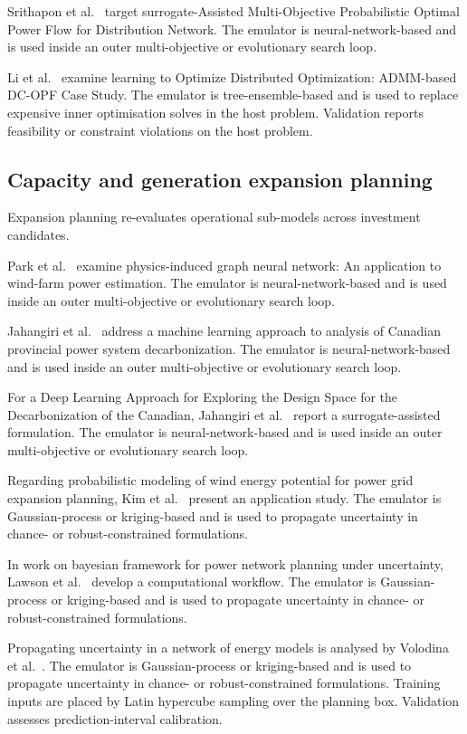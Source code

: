 Srithapon et al.~\cite{Srithapon202134395} target surrogate-Assisted Multi-Objective Probabilistic Optimal Power Flow for Distribution Network. The emulator is neural-network-based and is used inside an outer multi-objective or evolutionary search loop.

Li et al.~\cite{Li2023__2} examine learning to Optimize Distributed Optimization: ADMM-based DC-OPF Case Study. The emulator is tree-ensemble-based and is used to replace expensive inner optimisation solves in the host problem. Validation reports feasibility or constraint violations on the host problem.

\subsection{Capacity and generation expansion planning}
\label{sec:apps:expansion}

Expansion planning re-evaluates operational sub-models across investment candidates.

Park et al.~\cite{Park2019} examine physics-induced graph neural network: An application to wind-farm power estimation. The emulator is neural-network-based and is used inside an outer multi-objective or evolutionary search loop.

Jahangiri et al.~\cite{Jahangiri20244849} address a machine learning approach to analysis of Canadian provincial power system decarbonization. The emulator is neural-network-based and is used inside an outer multi-objective or evolutionary search loop.

For a Deep Learning Approach for Exploring the Design Space for the Decarbonization of the Canadian, Jahangiri et al.~\cite{Jahangiri2023} report a surrogate-assisted formulation. The emulator is neural-network-based and is used inside an outer multi-objective or evolutionary search loop.

Regarding probabilistic modeling of wind energy potential for power grid expansion planning, Kim et al.~\cite{Kim2021} present an application study. The emulator is Gaussian-process or kriging-based and is used to propagate uncertainty in chance- or robust-constrained formulations.

In work on bayesian framework for power network planning under uncertainty, Lawson et al.~\cite{Lawson201647} develop a computational workflow. The emulator is Gaussian-process or kriging-based and is used to propagate uncertainty in chance- or robust-constrained formulations.

Propagating uncertainty in a network of energy models is analysed by Volodina et al.~\cite{Volodina2022}. The emulator is Gaussian-process or kriging-based and is used to propagate uncertainty in chance- or robust-constrained formulations. Training inputs are placed by Latin hypercube sampling over the planning box. Validation assesses prediction-interval calibration.

